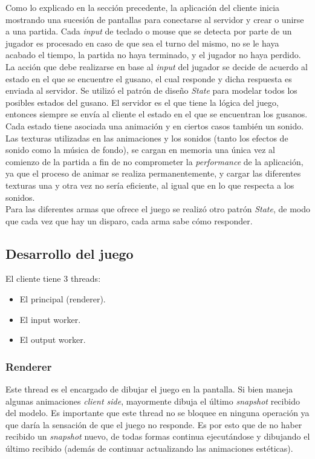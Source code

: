 Como lo explicado en la sección precedente, la aplicación del cliente inicia mostrando una sucesión de pantallas para conectarse al servidor y crear o unirse a una partida. Cada \textit{input} de teclado o mouse que se detecta por parte de un jugador es procesado en caso de que sea el turno del mismo, no se le haya acabado el tiempo, la partida no haya terminado, y el jugador no haya perdido. La acción que debe realizarse en base al \textit{input} del jugador se decide de acuerdo al estado en el que se encuentre el gusano, el cual responde y dicha respuesta es enviada al servidor. Se utilizó el patrón de diseño \textit{State} para modelar todos los posibles estados del gusano. El servidor es el que tiene la lógica del juego, entonces siempre se envía al cliente el estado en el que se encuentran los gusanos. Cada estado tiene asociada una animación y en ciertos casos también un sonido.\\
\indent Las texturas utilizadas en las animaciones y los sonidos (tanto los efectos de sonido como la música de fondo), se cargan en memoria una única vez al comienzo de la partida a fin de no comprometer la \textit{performance} de la aplicación, ya que el proceso de animar se realiza permanentemente, y cargar las diferentes texturas una y otra vez no sería eficiente, al igual que en lo que respecta a los sonidos.\\
\indent Para las diferentes armas que ofrece el juego se realizó otro patrón \textit{State}, de modo que cada vez que hay un disparo, cada arma sabe cómo responder.

\subsection{Desarrollo del juego}
El cliente tiene 3 threads:

\begin{itemize}
    \item El principal (renderer).
    \item El input worker.
    \item El output worker.
\end{itemize}


\subsubsection{Renderer}

Este thread es el encargado de dibujar el juego en la pantalla. Si bien maneja algunas animaciones \textit{client side},
mayormente dibuja el \'ultimo \textit{snapshot} recibido del modelo. Es importante que este thread no se bloquee en ninguna
operaci\'on ya que dar\'ia la sensaci\'on de que el juego no responde. Es por esto que de no haber recibido un
\textit{snapshot} nuevo, de todas formas continua ejecut\'andose y dibujando el \'ultimo recibido (adem\'as de continuar
actualizando las animaciones est\'eticas).

